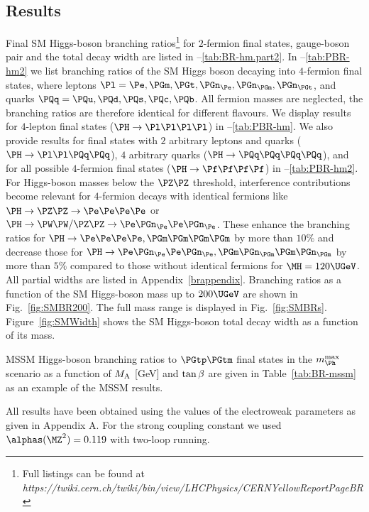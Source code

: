 \subsection{Results}

Final SM Higgs-boson branching ratios\footnote{Full listings can be found at
  {\sl https://twiki.cern.ch/twiki/bin/view/LHCPhysics/CERNYellowReportPageBR}}
for $2$-fermion final states,
gauge-boson pair and the total decay width are listed
in --\ref{tab:BR-hm.part2}.
In --\ref{tab:PBR-hm2} we list branching
ratios of the SM Higgs boson decaying into $4$-fermion final states,
where leptons $\Pl=\Pe,\PGm,\PGt,\PGn_{\Pe},\PGn_{\PGm},\PGn_{\PGt}$, 
and quarks $\PQq=\PQu,\PQd,\PQs,\PQc,\PQb$. 
All fermion masses are neglected, the branching ratios are therefore
identical for different flavours.
We display results for $4$-lepton final states ($\PH \to
\Pl\Pl\Pl\Pl$) in --\ref{tab:PBR-hm}. 
We also provide results for final states with $2$ arbitrary leptons
and quarks ($\PH \to \Pl\Pl\PQq\PQq$),
$4$ arbitrary quarks ($\PH \to \PQq\PQq\PQq\PQq$),
and for all possible $4$-fermion final states ($\PH \to \Pf\Pf\Pf\Pf$)
in --\ref{tab:PBR-hm2}. 
For Higgs-boson masses below the
$\PZ\PZ$ threshold, interference contributions become relevant for $4$-fermion decays with identical
fermions like $\PH\to\PZ\PZ\to\Pe\Pe\Pe\Pe$ or
$\PH\to\PW\PW/\PZ\PZ\to\Pe\PGn_{\Pe}\Pe\PGn_{\Pe}$. These enhance
the branching ratios for $\PH \to
\Pe\Pe\Pe\Pe,\PGm\PGm\PGm\PGm$ by more than
$10\%$ and decrease those for
$\PH\to\Pe\PGn_{\Pe}\Pe\PGn_{\Pe}, \PGm\PGn_{\PGm}\PGm\PGn_{\PGm}$
by more than $5\%$ compared to those without identical fermions for
$\MH=120\UGeV$.
All partial widths are listed in Appendix~\ref{brappendix}.
Branching ratios as a function of the SM Higgs-boson mass up to $200\UGeV$ are shown in Fig.~\ref{fig:SMBR200}. The full mass range is displayed in Fig.~\ref{fig:SMBRs}. Figure~\ref{fig:SMWidth} shows the SM Higgs-boson total decay width as a function of its mass. 

MSSM Higgs-boson branching ratios to $\PGtp\PGtm$ final states in the
$m_{\Ph}^{\rm max}$ scenario as a function of $M_{\mathrm{A}}$ [GeV] and $\tan\beta$ are given
in Table~\ref{tab:BR-mssm} as an example of the MSSM results.

All results have been obtained using the values of the electroweak parameters as given in Appendix A. For the strong coupling constant we used $\alphas(\MZ^2) = 0.119$ with two-loop running.

